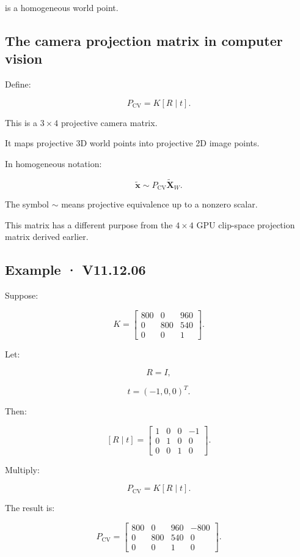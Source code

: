 is a homogeneous world point.

\subsection{The camera projection matrix in computer vision}\label{02-foundations-ii-ch035-the-camera-projection-matrix-in-computer-vision}

Define:

\[
 \boxed{ P_{\mathrm{CV}}=K[R\mid t] }.
\]

This is a \(3\times4\) projective camera matrix.

It maps projective 3D world points into projective 2D image points.

In homogeneous notation:

\[
 \boxed{ \tilde{\mathbf x}\sim P_{\mathrm{CV}}\tilde{\mathbf X}_W }.
\]

The symbol \(\sim\) means projective equivalence up to a nonzero scalar.

This matrix has a different purpose from the \(4\times4\) GPU clip-space projection matrix derived earlier.

\subsection{Example · V11.12.06}\label{02-foundations-ii-ch035-example-v11.12.06}

Suppose:

\[
 K= \begin{bmatrix} 800&0&960\\ 0&800&540\\ 0&0&1 \end{bmatrix}.
\]

Let:

\[
 R=I,
\]

\[
 t=(-1,0,0)^T.
\]

Then:

\[
 [R\mid t] = \begin{bmatrix} 1&0&0&-1\\ 0&1&0&0\\ 0&0&1&0 \end{bmatrix}.
\]

Multiply:

\[
 P_{\mathrm{CV}}= K[R\mid t].
\]

The result is:

\[
 \boxed{ P_{\mathrm{CV}}= \begin{bmatrix} 800&0&960&-800\\ 0&800&540&0\\ 0&0&1&0 \end{bmatrix} }.
\]


